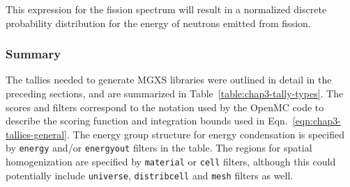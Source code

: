 \noindent This expression for the fission spectrum will result in a normalized discrete probability distribution for the energy of neutrons emitted from fission.


\subsubsection{Summary}
\label{subsubsec:chap3-tally-types-summary}

The tallies needed to generate \ac{MGXS} libraries were outlined in detail in the preceding sections, and are summarized in Table~\ref{table:chap3-tally-types}. The scores and filters correspond to the notation used by the OpenMC code to describe the scoring function and integration bounds used in Eqn.~\ref{eqn:chap3-tallies-general}. 
The energy group structure for energy condensation is specified by \texttt{energy} and/or \texttt{energyout} filters in the table. The regions for spatial homogenization are specified by \texttt{material} or \texttt{cell} filters, although this could potentially include \texttt{universe}, \texttt{distribcell} and \texttt{mesh} filters as well.



